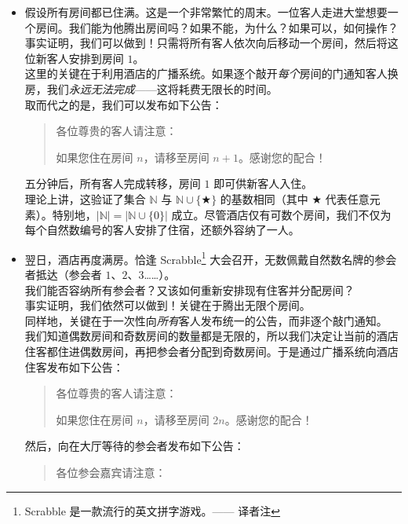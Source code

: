 \begin{itemize}
    \item 假设所有房间都已住满。这是一个非常繁忙的周末。一位客人走进大堂想要一个房间。我们能为他腾出房间吗？如果不能，为什么？如果可以，如何操作？\\
     
          事实证明，我们可以做到！只需将所有客人依次向后移动一个房间，然后将这位新客人安排到房间 $1$。\\

          这里的关键在于利用酒店的广播系统。如果逐个敲开\emph{每个}房间的门通知客人换房，我们\emph{永远无法完成}——这将耗费无限长的时间。\\

          取而代之的是，我们可以发布如下公告：
          \begin{quotation}
              各位尊贵的客人请注意：

              如果您住在房间 $n$，请移至房间 $n+1$。感谢您的配合！
          \end{quotation}
          五分钟后，所有客人完成转移，房间 $1$ 即可供新客人入住。\\

          理论上讲，这验证了集合 $\mathbb{N}$ 与 $\mathbb{N} \cup \{ \bigstar \}$ 的基数相同（其中 $\bigstar$ 代表任意元素）。特别地，$|\mathbb{N}| = |\mathbb{N} \cup \{0\}|$ 成立。尽管酒店仅有可数个房间，我们不仅为每个自然数编号的客人安排了住宿，还额外容纳了一人。\\
    \item 翌日，酒店再度满房。恰逢 Scrabble\footnote{Scrabble 是一款流行的英文拼字游戏。—— 译者注} 大会召开，无数佩戴自然数名牌的参会者抵达（参会者 $1$、$2$、$3$……）。\\

          我们能否容纳所有参会者？又该如何重新安排现有住客并分配房间？\\

          事实证明，我们依然可以做到！关键在于腾出无限个房间。\\

          同样地，关键在于一次性向\emph{所有}客人发布统一的公告，而非逐个敲门通知。\\

          我们知道偶数房间和奇数房间的数量都是无限的，所以我们决定让当前的酒店住客都住进偶数房间，再把参会者分配到奇数房间。于是通过广播系统向酒店住客发布如下公告：
          \begin{quotation}
              各位尊贵的客人请注意：

              如果您住在房间 $n$，请移至房间 $2n$。感谢您的配合！
          \end{quotation}
          然后，向在大厅等待的参会者发布如下公告：
          \begin{quotation}
              各位参会嘉宾请注意：


\end{quotation}
\end{itemize}
